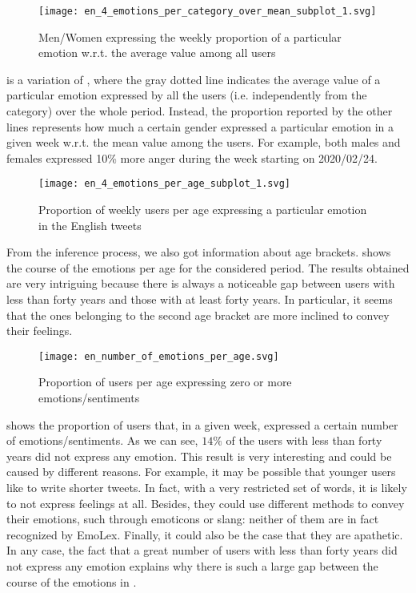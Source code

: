 \begin{figure}[H]
	\centering
    	\texttt{[image: en\_4\_emotions\_per\_category\_over\_mean\_subplot\_1.svg]}
    	\caption{Men/Women expressing the weekly proportion of a particular emotion w.r.t. the average value among all users}
    	\label{fig:en-4-emotions-per-category-course-mean-1}
\end{figure}

 is a variation of , where the gray dotted line indicates the average value of a particular emotion expressed by all the users (i.e. independently from the category) over the whole period. Instead, the proportion reported by the other lines represents how much a certain gender expressed a particular emotion in a given week w.r.t. the mean value among the users. For example, both males and females expressed 10\% more anger during the week starting on 2020/02/24.

\begin{figure}[H]
	\centering
    	\texttt{[image: en\_4\_emotions\_per\_age\_subplot\_1.svg]}
    	\caption{Proportion of weekly users per age expressing a particular emotion in the English tweets}
    	\label{fig:en-4-emotions-per-age-subplot-1}
\end{figure}

From the inference process, we also got information about age brackets.  shows the course of the emotions per age for the considered period. The results obtained are very intriguing because there is always a noticeable gap between users with less than forty years and those with at least forty years. In particular, it seems that the ones belonging to the second age bracket are more inclined to convey their feelings.

\begin{figure}[H]
	\centering
    	\texttt{[image: en\_number\_of\_emotions\_per\_age.svg]}
    	\caption{Proportion of users per age expressing zero or more emotions/sentiments}
    	\label{fig:en-4-emotions-per-age-per-number}
\end{figure}

 shows the proportion of users that, in a given week, expressed a certain number of emotions/sentiments. As we can see, \(14 \%\) of the users with less than forty years did not express any emotion. This result is very interesting and could be caused by different reasons. For example, it may be possible that younger users like to write shorter tweets. In fact, with a very restricted set of words, it is likely to not express feelings at all. Besides, they could use different methods to convey their emotions, such through emoticons or slang: neither of them are in fact recognized by EmoLex. Finally, it could also be the case that they are apathetic. In any case, the fact that a great number of users with less than forty years did not express any emotion explains why there is such a large gap between the course of the emotions in .

